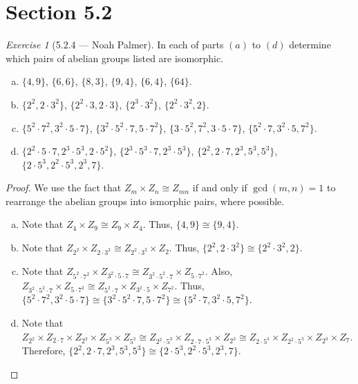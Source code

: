 \documentclass[12pt]{amsart}
\theoremstyle{remark}
\newtheorem*{exercise}{Exercise}%
\theoremstyle{mycomment}
\begin{document}
\section*{Section 5.2}
\begin{exercise}[5.2.4 --- Noah Palmer] In each of parts $(a)$ to $(d)$ determine which pairs of abelian groups listed are isomorphic.
\begin{enumerate}[(a)]
\item $\{4,9\}$, $\{6,6\}$, $\{8,3\}$, $\{9,4\}$, $\{6,4\}$, $\{64\}$.
\item $\{2^2, 2\cdot3^2\}$, $\{2^2\cdot3, 2\cdot3\}$, $\{2^3\cdot3^2\}$, $\{2^2\cdot3^2,2\}$.
\item $\{5^2\cdot7^2,3^2\cdot5\cdot7\}$, $\{3^2\cdot5^2\cdot7,5\cdot7^2\}$, $\{3\cdot5^2,7^2,3\cdot5\cdot7\}$, $\{5^2\cdot7,3^2\cdot5,7^2\}$.
\item $\{2^2\cdot5\cdot7, 2^3\cdot5^3,2\cdot5^2\}$, $\{2^3\cdot5^3\cdot7,2^3\cdot5^3\}$, $\{2^2,2\cdot7,2^3,5^3,5^3\}$, $\{2\cdot5^3,2^2\cdot5^3,2^3,7\}$.
\end{enumerate}
\begin{proof}
We use the fact that $Z_m\times Z_n\cong Z_{mn}$ if and only if $\gcd(m,n)=1$ to rearrange the abelian groups into ismorphic pairs, where possible.
\begin{enumerate}[(a)]
\item Note that $ Z_4\times Z_9\cong Z_9\times Z_4$. Thus, $\{4,9\}\cong\{9,4\}$.
\item Note that $ Z_{2^2}\times Z_{2\cdot3^2}\cong Z_{2^2\cdot3^2}\times Z_2$. Thus, $\{2^2, 2\cdot3^2\}\cong\{2^2\cdot3^2,2\}$.
\item Note that $Z_{5^2\cdot 7^2}\times Z_{3^2\cdot 5\cdot 7}\cong Z_{3^2\cdot 5^2\cdot 7}\times Z_{5\cdot 7^2}$. Also, $Z_{3^2\cdot 5^2\cdot 7}\times Z_{5\cdot 7^2}\cong Z_{5^2\cdot 7}\times Z_{3^2\cdot 5}\times Z_{7^2}$. Thus, $\{5^2\cdot7^2,3^2\cdot5\cdot7\}\cong\{3^2\cdot5^2\cdot7,5\cdot7^2\}\cong\{5^2\cdot7,3^2\cdot5,7^2\}$.
\item Note that $ Z_{2^2}\times Z_{2\cdot7}\times Z_{2^3}\times Z_{5^3}\times Z_{5^3}\cong Z_{2^2\cdot5^3}\times Z_{2\cdot7\cdot5^3}\times Z_{2^3}\cong Z_{2\cdot5^3}\times Z_{2^2\cdot5^3}\times Z_{2^3}\times Z_7$. Therefore, $\{2^2,2\cdot7,2^3,5^3,5^3\}\cong\{2\cdot5^3,2^2\cdot5^3,2^3,7\}$.
\end{enumerate}
\end{proof}
\end{exercise}
\end{document}
